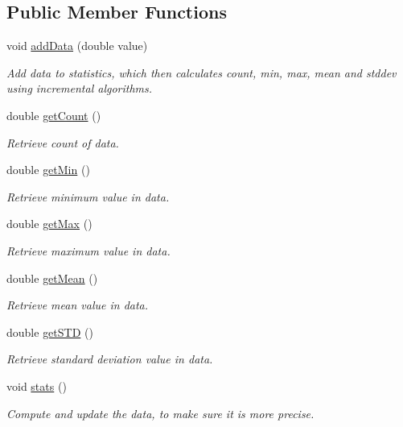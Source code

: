 \subsection*{Public Member Functions}
\begin{DoxyCompactItemize}
\item 
void \hyperlink{classec_1_1_e_c_statistics_a60feff78d1b3a0b548544d9cfbd6a051}{add\+Data} (double value)
\begin{DoxyCompactList}\small\item\em Add data to statistics, which then calculates count, min, max, mean and stddev using incremental algorithms. \end{DoxyCompactList}\item 
double \hyperlink{classec_1_1_e_c_statistics_abb7e2fa1c13cea018e3cf1e2a82309db}{get\+Count} ()
\begin{DoxyCompactList}\small\item\em Retrieve count of data. \end{DoxyCompactList}\item 
double \hyperlink{classec_1_1_e_c_statistics_a2e37a5bd92ed681173461776f562375e}{get\+Min} ()
\begin{DoxyCompactList}\small\item\em Retrieve minimum value in data. \end{DoxyCompactList}\item 
double \hyperlink{classec_1_1_e_c_statistics_a5585b02f584a18bef7a792b76710c225}{get\+Max} ()
\begin{DoxyCompactList}\small\item\em Retrieve maximum value in data. \end{DoxyCompactList}\item 
double \hyperlink{classec_1_1_e_c_statistics_a62f3366afb939bb372e1ec1fd5aec3bc}{get\+Mean} ()
\begin{DoxyCompactList}\small\item\em Retrieve mean value in data. \end{DoxyCompactList}\item 
double \hyperlink{classec_1_1_e_c_statistics_a62cb7d1e5f86a179c68cc8a9c450b835}{get\+S\+TD} ()
\begin{DoxyCompactList}\small\item\em Retrieve standard deviation value in data. \end{DoxyCompactList}\item 
\mbox{\label{classec_1_1_e_c_statistics_a120060ecbd8161d900c74f713ef3df22}} 
void \hyperlink{classec_1_1_e_c_statistics_a120060ecbd8161d900c74f713ef3df22}{stats} ()
\begin{DoxyCompactList}\small\item\em Compute and update the data, to make sure it is more precise. \end{DoxyCompactList}\end{DoxyCompactItemize}


